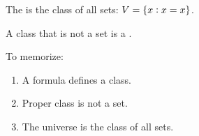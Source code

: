 \begin{definition}[universe]
    The  is the class of all sets: $V = \set{x: x = x}$.
\end{definition}

\begin{definition}
    A class that is not a set is a .
\end{definition}


To memorize:
\begin{enumerate}
    \item A formula defines a class.
    \item Proper class is not a set.
    \item The universe is the class of all sets.
\end{enumerate}






